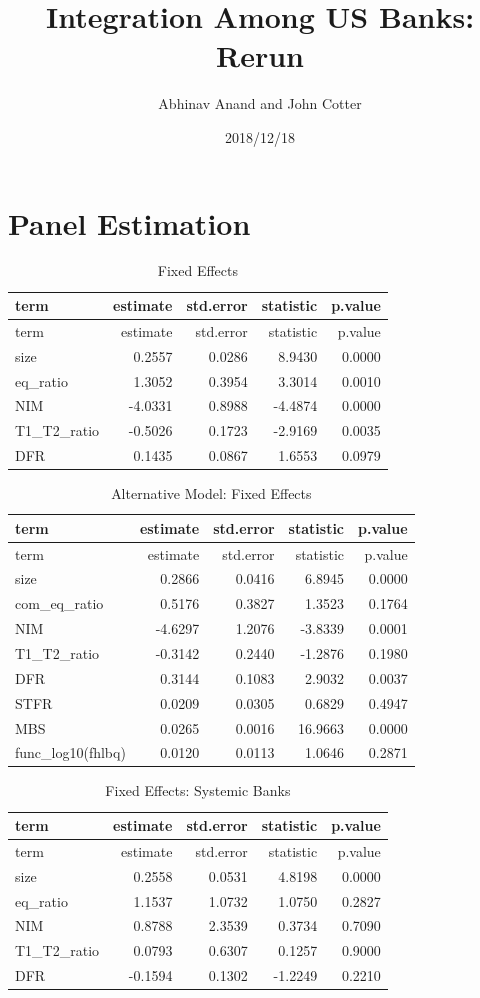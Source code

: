 \documentclass[11pt,]{article}
\title{Integration Among US Banks: Rerun}
\author{Abhinav Anand and John Cotter}
\date{2018/12/18}
\begin{document}
\maketitle

\section{Panel Estimation}\label{panel-estimation}

\begin{longtable}[]{@{}lrrrr@{}}
\caption{Fixed Effects}\tabularnewline
\toprule
term & estimate & std.error & statistic & p.value\tabularnewline
\midrule
\endfirsthead
\toprule
term & estimate & std.error & statistic & p.value\tabularnewline
\midrule
\endhead
size & 0.2557 & 0.0286 & 8.9430 & 0.0000\tabularnewline
eq\_ratio & 1.3052 & 0.3954 & 3.3014 & 0.0010\tabularnewline
NIM & -4.0331 & 0.8988 & -4.4874 & 0.0000\tabularnewline
T1\_T2\_ratio & -0.5026 & 0.1723 & -2.9169 & 0.0035\tabularnewline
DFR & 0.1435 & 0.0867 & 1.6553 & 0.0979\tabularnewline
\bottomrule
\end{longtable}

\begin{longtable}[]{@{}lrrrr@{}}
\caption{Alternative Model: Fixed Effects}\tabularnewline
\toprule
term & estimate & std.error & statistic & p.value\tabularnewline
\midrule
\endfirsthead
\toprule
term & estimate & std.error & statistic & p.value\tabularnewline
\midrule
\endhead
size & 0.2866 & 0.0416 & 6.8945 & 0.0000\tabularnewline
com\_eq\_ratio & 0.5176 & 0.3827 & 1.3523 & 0.1764\tabularnewline
NIM & -4.6297 & 1.2076 & -3.8339 & 0.0001\tabularnewline
T1\_T2\_ratio & -0.3142 & 0.2440 & -1.2876 & 0.1980\tabularnewline
DFR & 0.3144 & 0.1083 & 2.9032 & 0.0037\tabularnewline
STFR & 0.0209 & 0.0305 & 0.6829 & 0.4947\tabularnewline
MBS & 0.0265 & 0.0016 & 16.9663 & 0.0000\tabularnewline
func\_log10(fhlbq) & 0.0120 & 0.0113 & 1.0646 & 0.2871\tabularnewline
\bottomrule
\end{longtable}

\begin{longtable}[]{@{}lrrrr@{}}
\caption{Fixed Effects: Systemic Banks}\tabularnewline
\toprule
term & estimate & std.error & statistic & p.value\tabularnewline
\midrule
\endfirsthead
\toprule
term & estimate & std.error & statistic & p.value\tabularnewline
\midrule
\endhead
size & 0.2558 & 0.0531 & 4.8198 & 0.0000\tabularnewline
eq\_ratio & 1.1537 & 1.0732 & 1.0750 & 0.2827\tabularnewline
NIM & 0.8788 & 2.3539 & 0.3734 & 0.7090\tabularnewline
T1\_T2\_ratio & 0.0793 & 0.6307 & 0.1257 & 0.9000\tabularnewline
DFR & -0.1594 & 0.1302 & -1.2249 & 0.2210\tabularnewline
\bottomrule
\end{longtable}
\end{document}
